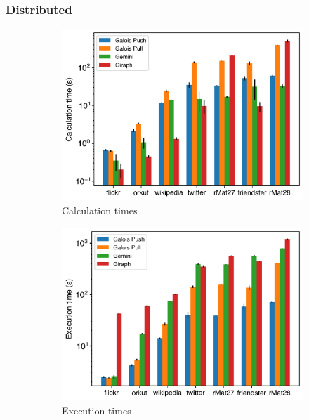 \subsubsection{Distributed}
\begin{figure}
	\centering
	\begin{subfigure}{0.32\textwidth}
		\includegraphics[width=\linewidth]{../../plots/distributedSSSP_calcTime.png}
		\caption{Calculation times}
		\label{fig:distributedSSSP_calc}
	\end{subfigure}
	\hfil
	\begin{subfigure}{0.32\textwidth}
		\includegraphics[width=\linewidth]{../../plots/distributedSSSP_execTime.png}
		\caption{Execution times}
		\label{fig:distributedSSSP_exec}
	\end{subfigure}
	\hfil
	\begin{subfigure}{0.32\textwidth}

\end{subfigure}
\end{figure}
